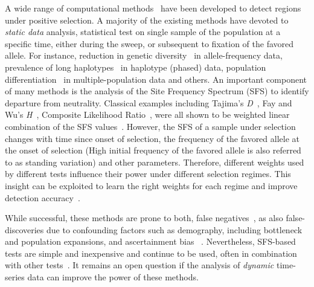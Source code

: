 \documentclass[11pt]{article}
\begin{document}
A wide range of computational methods~\cite{vitti2013detecting} have
been developed to detect regions under positive selection. A majority
of the existing methods have devoted to \emph{static data} analysis,
statistical test on single sample of the population at a specific
time, either during the sweep, or subsequent to fixation of the
favored allele. For instance, reduction in genetic
diversity~\cite{tajima1989statistical,fay2000hitchhiking,ronen2013learning}
in allele-frequency data, prevalence of long
haplotypes~\cite{sabeti2006positive,vitti2013detecting} in haplotype
(phased) data, population
differentiation~\cite{holsinger2009genetics,burke2010genome} in
multiple-population data and others. An important component of many
methods is the analysis of the Site Frequency Spectrum (SFS) to
identify departure from neutrality. Classical examples including
Tajima's \emph{D}~\cite{tajima1989statistical}, Fay and Wu's
\emph{H}~\cite{fay2000hitchhiking}, Composite Likelihood
Ratio~\cite{nielsen2005genomic}, were all shown to be weighted linear
combination of the SFS values~\cite{achaz2009frequency}. However, the
SFS of a sample under selection changes with time since onset of
selection, the frequency of the favored allele at the onset of
selection (High initial frequency of the favored allele is also
referred to as standing variation) and other parameters. Therefore,
different weights used by different tests influence their power under
different selection regimes. This insight can be exploited to learn
the right weights for each regime and improve detection
accuracy~\cite{ronen2013learning}.

While successful, these methods are prone to both, false
negatives~\cite{messer2013population}, as also false-discoveries due
to confounding factors such as demography, including bottleneck and
population expansions, and ascertainment bias ~\cite{ptak2002evidence,
  ramos2002statistical,akey2009constructing,
  nielsen2003correcting,messer2013population}. Nevertheless, SFS-based
tests are simple and inexpensive and continue to be used, often in
combination with other
tests~\cite{akey2009constructing,vitti2013detecting}. It remains an
open question if the analysis of \emph{dynamic} time-series data can
improve the power of these methods.
\end{document}
